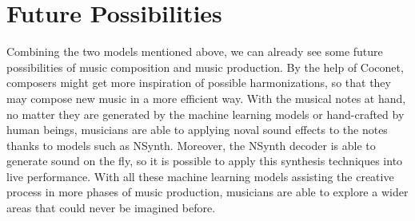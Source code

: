 \documentclass[jou]{apa6}
\begin{document}
\section{Future Possibilities}

Combining the two models mentioned above, we can already see some future possibilities of music composition and music production. By the help of Coconet, composers might get more inspiration of possible harmonizations, so that they may compose new music in a more efficient way. With the musical notes at hand, no matter they are generated by the machine learning models or hand-crafted by human beings, musicians are able to applying noval sound effects to the notes thanks to models such as NSynth. Moreover, the NSynth decoder is able to generate sound on the fly, so it is possible to apply this synthesis techniques into live performance. With all these machine learning models assisting the creative process in more phases of music production, musicians are able to explore a wider areas that could never be imagined before.

\printbibliography
\end{document}
